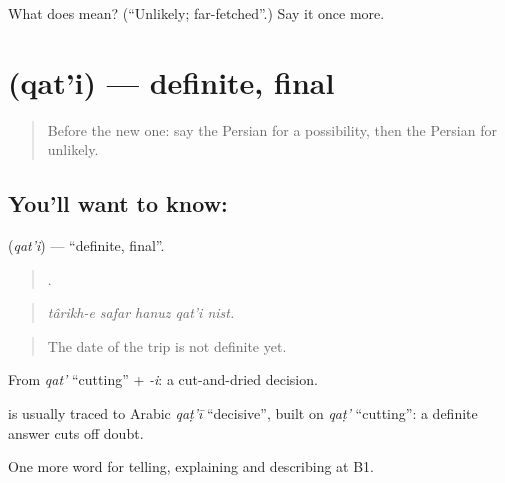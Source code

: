 \begin{tcolorbox}[breakable,colback=teal!4,colframe=teal!35!black,title={Before you move on}]
What does  mean? (\textquotedblleft{}Unlikely; far-fetched\textquotedblright{}.) Say it once more.
\end{tcolorbox}
\section[\texorpdfstring{\fa{قطعی} (qat'i)}{قطعی (qat'i)}]{ (qat'i) — definite, final}

\label{lesson:FA-C392-qati}



\begin{quote}
Before the new one: say the Persian for a possibility, then the Persian for unlikely.
\end{quote}

\subsection*{You'll want to know: }
\textbf{} (\emph{qat'i}) — \textquotedblleft{}definite, final\textquotedblright{}.

\begin{quote}
    .
\end{quote}

\begin{quote}
\emph{târikh-e safar hanuz qat'i nist.}
\end{quote}

\begin{quote}
The date of the trip is not definite yet.
\end{quote}

From \emph{qat'} \textquotedblleft{}cutting\textquotedblright{} + \emph{-i}: a cut-and-dried decision.

\begin{cousinweb}
\textbf{} is usually traced to Arabic \emph{qaṭ'ī} \textquotedblleft{}decisive\textquotedblright{}, built on \emph{qaṭ'} \textquotedblleft{}cutting\textquotedblright{}: a definite answer cuts off doubt.
\end{cousinweb}

\begin{grammarlens}[title={What you've built}]
One more word for telling, explaining and describing at B1.
\end{grammarlens}

